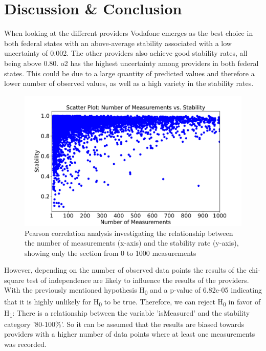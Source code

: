 \documentclass{article}
\theoremstyle{plain}
\theoremstyle{definition}
\theoremstyle{remark}
\begin{document}
\section{Discussion \& Conclusion}\label{sec:conclusion}
When looking at the different providers Vodafone emerges as the best choice in both federal states with an above-average stability associated with a low uncertainty of 0.002. 
The other providers also achieve good stability rates, all being above 0.80. o2 has the highest uncertainty among providers in both federal states. This could be due to a large quantity of predicted values and therefore a lower number of observed values, as well as a high variety in the stability rates.
\begin{figure}[H]
\vskip 0.2in
\begin{center}
\centerline{\includegraphics[width=\columnwidth]{measurementStability.pdf}}
\caption{Pearson correlation analysis investigating the relationship between the number of measurements (x-axis) and the stability rate (y-axis), showing only the section from 0 to 1000 measurements}
\label{fig:pearson}
\end{center}
\vskip -0.2in
\end{figure}
However, depending on the number of observed data points the results of the chi-square test of independence are likely to influence the results of the providers. With the previously mentioned hypothesis H\textsubscript{0} and a p-value of 6.82e-05 indicating that it is highly unlikely for H\textsubscript{0} to be true. Therefore, we can reject H\textsubscript{0} in favor of H\textsubscript{1}: There is a relationship between the variable 'isMeasured' and the stability category '80-100\%'. So it can be assumed that the results are biased towards providers with a higher number of data points where at least one measurements was recorded.
\end{document}
